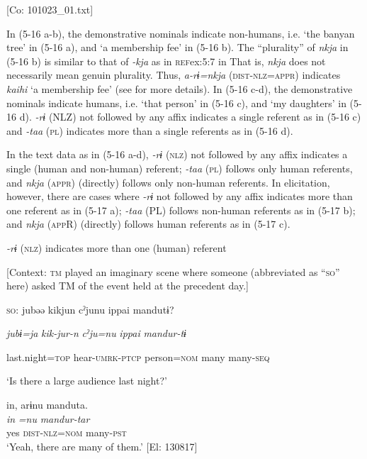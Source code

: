     [Co: 101023\_01.txt]
    \z
\z

In (5-16 a-b), the demonstrative nominals indicate non-humans, i.e. ‘the banyan tree’ in (5-16 a), and ‘a membership fee’ in (5-16 b). The “plurality” of \textit{nkja} in (5-16 b) is similar to that of \textit{{}-kja} as in \textsc{ref}{ex:5:7} in  That is, \textit{nkja} does not necessarily mean genuin plurality. Thus, \textit{a-rɨ=nkja} (\textsc{dist}-\textsc{nlz}=\textsc{appr}) indicates \textit{kaihi} ‘a membership fee’ (see  for more details). In (5-16 c-d), the demonstrative nominals indicate humans, i.e. ‘that person’ in (5-16 c), and ‘my daughters’ in (5-16 d). \textit{{}-rɨ} (NLZ) not followed by any affix indicates a single referent as in (5-16 c) and \textit{{}-taa} (\textsc{pl}) indicates more than a single referents as in (5-16 d).

  In the text data as in (5-16 a-d), \textit{{}-rɨ} (\textsc{nlz}) not followed by any affix indicates a single (human and non-human) referent; \textit{{}-taa} (\textsc{pl}) follows only human referents, and \textit{nkja} (\textsc{appr}) (directly) follows only non-human referents. In elicitation, however, there are cases where \textit{{}-rɨ} not followed by any affix indicates more than one referent as in (5-17 a); \textit{{}-taa} (PL) follows non-human referents as in (5-17 b); and \textit{nkja} (\textsc{app}R) (directly) follows human referents as in (5-17 c).

\ea \label{ex:5:17}  \ea \label{ex:5:17a} \textit{{}-rɨ} (\textsc{nlz}) indicates more than one (human) referent

    [Context: \textsc{tm} played an imaginary scene where someone (abbreviated as “\textsc{so}” here) asked TM of the event held at the precedent day.]

    \textsc{so}:  jubəə  kikjun  cˀjunu  ippai  mandutɨ?

      \textit{jubɨ=ja}  \textit{kik-jur-n}  \textit{cˀju=nu}  \textit{ippai}  \textit{mandur-tɨ}

      last.night=\textsc{top}  hear-\textsc{umrk}-\textsc{ptcp}  person=\textsc{nom}  many  many-\textsc{seq}

      ‘Is there a large audience last night?’

\glll  in,  arɨnu  manduta.\\
\textit{in}  \textit{=nu}  \textit{mandur-tar}\\
yes  \textsc{dist}-\textsc{nlz}=\textsc{nom}  many-\textsc{pst}\\
\glt ‘Yeah, there are many of them.’ [El: 130817]


